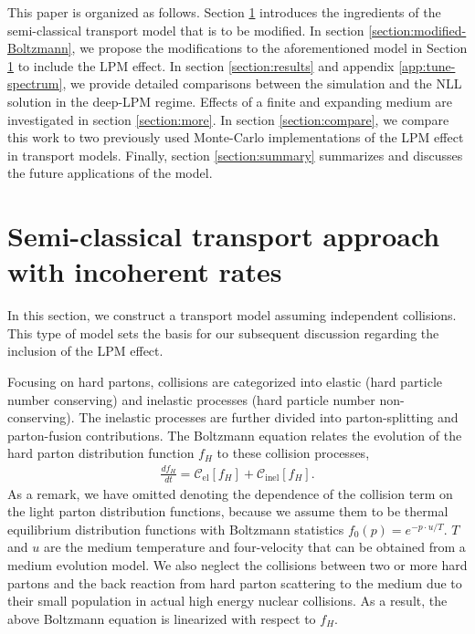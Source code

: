 \documentclass[aps, prc, reprint, amsmath, groupedaddress, nofootinbib]{revtex4-1}
\begin{document}
This paper is organized as follows. 
Section \ref{section:Boltzmann} introduces the ingredients of the semi-classical transport model that is to be modified.
In section \ref{section:modified-Boltzmann}, we propose the modifications to the aforementioned model in Section \ref{section:Boltzmann} to include the LPM effect.
In section \ref{section:results} and appendix \ref{app:tune-spectrum}, we provide detailed comparisons between the simulation and the NLL solution in the deep-LPM regime.
Effects of a finite and expanding medium are investigated in section \ref{section:more}.
In section \ref{section:compare}, we compare this work to two previously used Monte-Carlo implementations of the LPM effect in transport models.
Finally, section \ref{section:summary} summarizes and discusses the future applications of the model.

\section{Semi-classical transport approach with incoherent rates}\label{section:Boltzmann}
In this section, we construct a transport model assuming independent collisions. This type of model sets the basis for our subsequent discussion regarding the inclusion of the LPM effect.

Focusing on hard partons, collisions are categorized into elastic (hard particle number conserving) and inelastic processes (hard particle number non-conserving). 
The inelastic processes are further divided into parton-splitting and parton-fusion contributions. 
The Boltzmann equation relates the evolution of the hard parton distribution function $f_H$ to these collision processes,
\begin{eqnarray}
\frac{df_H}{dt} = \mathcal{C}_{\textrm{el}}[f_H] + \mathcal{C}_{\textrm{inel}}[f_H].
\end{eqnarray}
As a remark, we have omitted denoting the dependence of the collision term on the light parton distribution functions, because we assume them to be thermal equilibrium distribution functions with Boltzmann statistics $f_0(p) = e^{-p\cdot u/T}$. 
$T$ and $u$ are the medium temperature and four-velocity that can be obtained from a medium evolution model. 
We also neglect the collisions between two or more hard partons and the back reaction from hard parton scattering to the medium due to their small population in actual high energy nuclear collisions.
As a result, the above Boltzmann equation is linearized with respect to $f_H$.
\end{document}
